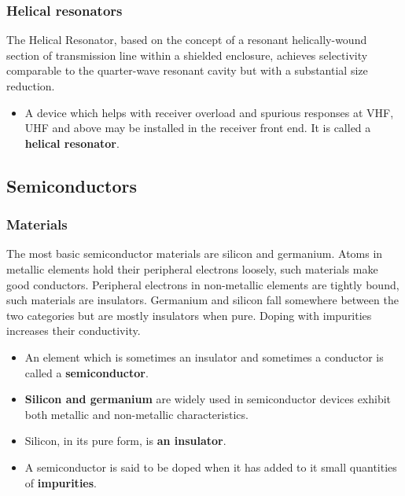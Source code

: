 \documentclass[letterpaper]{article}
\begin{document}
        \subsubsection{Helical resonators}
        The Helical Resonator, based on the concept of a resonant helically-wound section of transmission line within a shielded enclosure, achieves selectivity comparable to the quarter-wave resonant cavity but with a substantial size reduction.
        \begin{itemize}
            \item A device which helps with receiver overload and spurious responses at VHF, UHF and above may be installed in the receiver front end. It is called a \textbf{helical resonator}.
        \end{itemize}

        \newpage

        \subsection{Semiconductors}
        \subsubsection{Materials}
        The most basic semiconductor materials are silicon and germanium.
        Atoms in metallic elements hold their peripheral electrons loosely, such materials make good conductors.
        Peripheral electrons in non-metallic elements are tightly bound, such materials are insulators.
        Germanium and silicon fall somewhere between the two categories but are mostly insulators when pure.
        Doping with impurities increases their conductivity.
        \begin{itemize}
            \item An element which is sometimes an insulator and sometimes a conductor is called a \textbf{semiconductor}.
            \item \textbf{Silicon and germanium} are widely used in semiconductor devices exhibit both metallic and non-metallic characteristics.
            \item Silicon, in its pure form, is \textbf{an insulator}.
            \item A semiconductor is said to be doped when it has added to it small quantities of \textbf{impurities}.
        \end{itemize}
\end{document}
